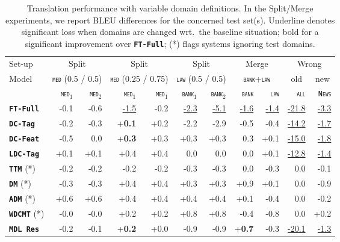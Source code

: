 \documentclass[11pt,a4paper]{article}
\newcommand{\fyDone}[1]{\done[FY]\Todo[FY:]{\textcolor{orange}{#1}}}
\newcommand{\domain}[1]{\texttt{\textsc{#1}}}
\newcommand{\system}[1]{\texttt{\textbf{#1}}}
\newcommand{\SB}[1]{\textbf{#1}}
\newcommand{\SW}[1]{\underline{#1}}
\begin{document}
\begin{table*}
  \centering%
  \begin{tabular}{|p{1.8cm}|*{10}{r|}} \hline
    \hfill Set-up & \multicolumn{2}{c|}{Split} &  \multicolumn{2}{c|}{Split} & \multicolumn{2}{c|}{Split} & \multicolumn{2}{c|}{Merge} & \multicolumn{2}{c|}{Wrong} \\ %
     Model \hfill & \multicolumn{2}{c|}{\domain{med} \footnotesize{(0.5 / 0.5)}} &  \multicolumn{2}{c|}{\domain{med} {\footnotesize (0.25 / 0.75)}} & \multicolumn{2}{c|}{\domain{law} {\footnotesize (0.5 / 0.5)}} & \multicolumn{2}{c|}{\domain{bank}+\domain{law}} &  \multicolumn{1}{c|}{old} &  \multicolumn{1}{c|}{new}\\ \hline
    & \domain{med}$_1$ & \domain{med}$_2$ & \domain{med}$_1$ & \domain{med}$_1$ &  \domain{bank}$_1$ & \domain{bank}$_2$ & \domain{bank} & \domain{law}   & \domain{all} & \domain{News} \\
    \system{FT-Full}      & -0.1 & -0.6 & \SW{-1.5} & -0.2& \SW{-2.3} & \SW{-5.1} &\SW{-1.6} & \SW{-1.4}& \SW{-21.8} & \SW{-3.3}\\%
    \system{DC-Tag}     & -0.2 & -0.3& +\SB{0.1}  & +0.2& -2.2 & -2.9 & -0.5 & -0.4 & \SW{-14.2} & \SW{-1.7}\\%
    \system{DC-Feat}    & -0.5 & 0.0 & +\SB{0.3}   & +0.3 & +0.3 & +0.3 & 0.3 & +0.1 & \SW{-15.0} &\SW{-1.8}\\ %
    \system{LDC-Tag}   & +0.1 & +0.1 & +0.4 & +0.4 & 0.0 &  0.0 &  0.0 & +0.1& \SW{-12.8} & \SW{-1.4}\\ %
    \system{TTM} (*)        & -0.2 &  -0.2 & -0.2 & -0.2 & -0.3 &-0.3 &  0.0 & -0.3 & 0.0 & -0.1\\
    \system{DM} (*)           & -0.3   & -0.3  & +0.4 & +0.4 & +0.3 & +0.3 & +0.9 & +0.1 & 0.0 &-0.9\\
    \system{ADM} (*)        & +0.6   & +0.6 & +0.4 & +0.4 & +0.4 & +0.4 &  +0.1 & -0.4 & 0.0&-0.2\\
    \system{WDCMT} (*)     & -0.0    & -0.0  & +0.2 & +0.2  & +0.8 & +0.8  & -0.4 & -0.8 & 0.0 & +0.2 \\
    \system{MDL Res}   & -0.2   & -0.1 & +\SB{0.2} &+0.0 & -0.9 & -0.9 & +\SB{0.7} & -0.3 & \SW{-20.1} & \SW{-1.3}\\ %
    \hline
  \end{tabular}
  \caption{Translation performance with variable domain definitions. In the Split/Merge experiments, we report BLEU differences for the concerned test set(s). Underline denotes significant loss when domains are changed wrt.\ the baseline situation; bold for a significant improvement over \system{FT-Full}; (*) flags systems ignoring test domains.
    \fyDone{Check wrong and significance of diff for ``old''}\fyDone{How about wrong ?}
  }
  \label{tab:redomains}
\end{table*}
\end{document}
